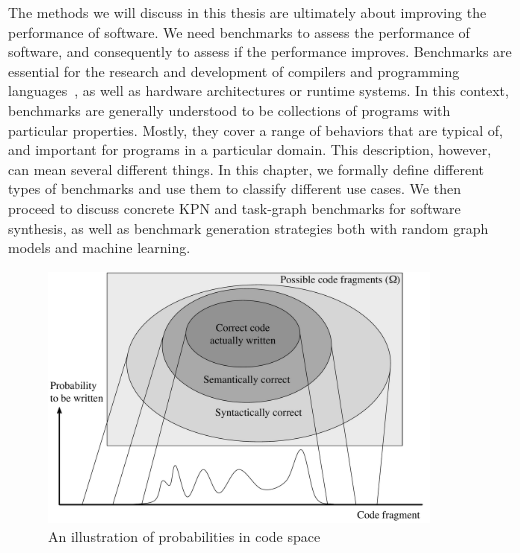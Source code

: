 The methods we will discuss in this thesis are ultimately about improving the performance of software. 
We need benchmarks to assess the performance of software, and consequently to assess if the performance improves.
Benchmarks are essential for the research and development of compilers and programming languages~\cite{hall_compiler_research}, as well as hardware architectures or runtime systems.
In this context, benchmarks are generally understood to be collections of programs with particular properties.
Mostly, they cover a range of behaviors that are typical of, and important for programs in a particular domain.
This description, however, can mean several different things.
In this chapter, we formally define different types of benchmarks and use them to classify different use cases.
We then proceed to discuss concrete \ac{KPN} and task-graph benchmarks for software synthesis, as well as benchmark generation strategies both with random graph models and machine learning.

\begin{figure}[h]
	\centering
	\includegraphics[width=0.9\textwidth]{figures/code_space_venn.pdf}
	\caption{An illustration of probabilities in code space}
	\label{fig:pdf_programs}
\end{figure}

